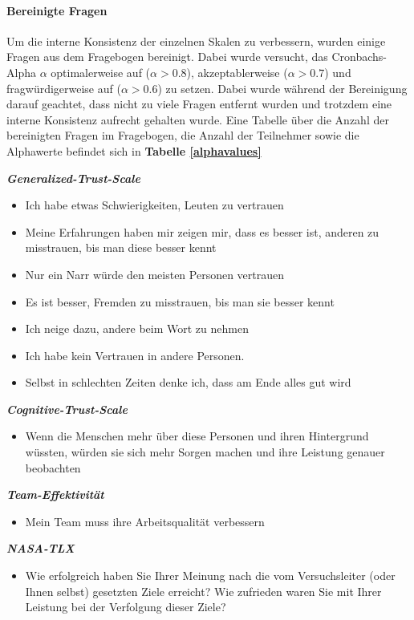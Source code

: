 \documentclass[a4paper,11pt]{article}%
\renewcommand{\\}{\vspace*{0.5\baselineskip} \newline}
\begin{document}
			\paragraph{Bereinigte Fragen}
Um die interne Konsistenz der einzelnen Skalen zu verbessern, wurden einige Fragen aus dem Fragebogen bereinigt. Dabei wurde versucht, das Cronbachs-Alpha $\alpha$ optimalerweise auf ($\alpha > 0.8$), akzeptablerweise ($\alpha > 0.7$) und fragwürdigerweise auf ($\alpha > 0.6$) zu setzen. Dabei wurde während der Bereinigung darauf geachtet, dass nicht zu viele Fragen entfernt wurden und trotzdem eine interne Konsistenz aufrecht gehalten wurde. Eine Tabelle über die Anzahl der bereinigten Fragen im Fragebogen, die Anzahl der Teilnehmer sowie die Alphawerte befindet sich in \textbf{Tabelle \ref{alphavalues}}

\textbf{\textit{Generalized-Trust-Scale}}
\begin{itemize}
	\item Ich habe etwas Schwierigkeiten, Leuten zu vertrauen
	\item Meine Erfahrungen haben mir zeigen mir, dass es besser ist, anderen zu misstrauen, bis man diese besser kennt
	\item Nur ein Narr würde den meisten Personen vertrauen
	\item Es ist besser, Fremden zu misstrauen, bis man sie besser kennt
	\item Ich neige dazu, andere beim Wort zu nehmen
	\item Ich habe kein Vertrauen in andere Personen.
	\item Selbst in schlechten Zeiten denke ich, dass am Ende alles gut wird
\end{itemize}

\textbf{\textit{Cognitive-Trust-Scale}}
\begin{itemize}
	\item Wenn die Menschen mehr über diese Personen und ihren Hintergrund wüssten, würden sie sich mehr Sorgen machen und ihre Leistung genauer beobachten
\end{itemize}

\textbf{\textit{Team-Effektivität}}
\begin{itemize}
	\item Mein Team muss ihre Arbeitsqualität verbessern
\end{itemize}

\textbf{\textit{NASA-TLX}}
\begin{itemize}
	\item Wie erfolgreich haben Sie Ihrer Meinung nach die vom Versuchsleiter (oder Ihnen selbst) gesetzten Ziele erreicht? Wie zufrieden waren Sie mit Ihrer Leistung bei der Verfolgung dieser Ziele? 
\end{itemize}
\end{document}
